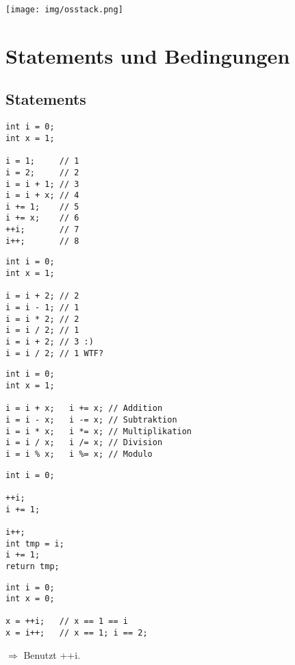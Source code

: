 \documentclass{beamer}
\begin{document}
\begin{frame}{\subsecname}
  \texttt{[image: img/osstack.png]}  
\end{frame}

\section{Statements und Bedingungen}
\subsection{Statements}
\begin{frame}[fragile]{\subsecname}
  \begin{lstlisting}
int i = 0;
int x = 1;

i = 1;     // 1
i = 2;     // 2
i = i + 1; // 3
i = i + x; // 4
i += 1;    // 5
i += x;    // 6
++i;       // 7
i++;       // 8
  \end{lstlisting}
\end{frame}

\begin{frame}[fragile]{\subsecname}
  \begin{lstlisting}
int i = 0;
int x = 1;

i = i + 2; // 2
i = i - 1; // 1
i = i * 2; // 2
i = i / 2; // 1
i = i + 2; // 3 :)
i = i / 2; // 1 WTF?
  \end{lstlisting}
\end{frame}

\begin{frame}[fragile]{\subsecname}
  \begin{lstlisting}
int i = 0;
int x = 1;

i = i + x;   i += x; // Addition
i = i - x;   i -= x; // Subtraktion
i = i * x;   i *= x; // Multiplikation
i = i / x;   i /= x; // Division
i = i % x;   i %= x; // Modulo
  \end{lstlisting}
\end{frame}

\begin{frame}[fragile]{\subsecname}
  \begin{lstlisting}
int i = 0;

++i;
i += 1;

i++;
int tmp = i;
i += 1;
return tmp;
  \end{lstlisting}
\end{frame}

\begin{frame}[fragile]{\subsecname}
  \begin{lstlisting}
int i = 0;
int x = 0;

x = ++i;   // x == 1 == i
x = i++;   // x == 1; i == 2; 
  \end{lstlisting}
  $\Rightarrow$ Benutzt ++i.
\end{frame}
\end{document}
